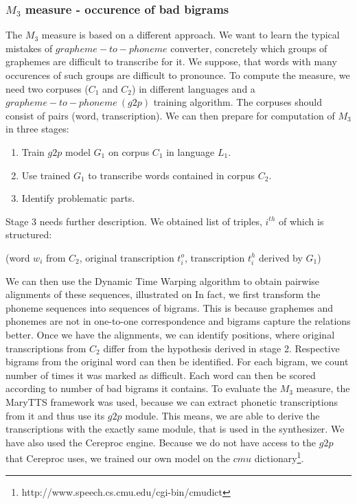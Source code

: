 \subsubsection{$M_3$ measure - occurence of bad bigrams}
The $M_3$ measure is based on a different approach.
We want to learn the typical mistakes of $grapheme-to-phoneme$ converter, concretely which groups of graphemes are difficult to transcribe for it.
We suppose, that words with many occurences of such groups are difficult to pronounce.
To compute the measure, we need two corpuses ($C_1$ and $C_2$) in different languages and a $grapheme-to-phoneme\:(g2p)$ training algorithm.
The corpuses should consist of pairs (word, transcription).
We can then prepare for computation of $M_3$ in three stages:
\begin{enumerate}
\item Train $g2p$ model $G_1$ on corpus $C_1$ in language $L_1$.
\item Use trained $G_1$ to transcribe words contained in corpus $C_2$.
\item Identify problematic parts.
\end{enumerate}
Stage 3 needs further description.
We obtained list of triples, $i^{th}$ of which is structured:
\begin{center}
(word $w_i$ from $C_2$, original transcription $t^o_i$, transcription $t^h_i$ derived by $G_1$)
\end{center}
We can then use the Dynamic Time Warping algorithm to obtain pairwise alignments of these sequences, illustrated on 
In fact, we first transform the phoneme sequences into sequences of bigrams.
This is because graphemes and phonemes are not in one-to-one correspondence and bigrams capture the relations better.
Once we have the alignments, we can identify positions, where original transcriptions from $C_2$ differ from the hypothesis derived in stage 2.
Respective bigrams from the original word can then be identified.
For each bigram, we count number of times it was marked as difficult.
Each word can then be scored according to number of bad bigrams it contains.
To evaluate the $M_3$ measure, the MaryTTS framework was used, because we can extract phonetic transcriptions from it and thus use its $g2p$ module.
This means, we are able to derive the transcriptions with the exactly same module, that is used in the synthesizer.
We have also used the Cereproc engine.
Because we do not have access to the $g2p$ that Cereproc uses, we trained our own model on the $cmu$ dictionary\footnote{http://www.speech.cs.cmu.edu/cgi-bin/cmudict}.
